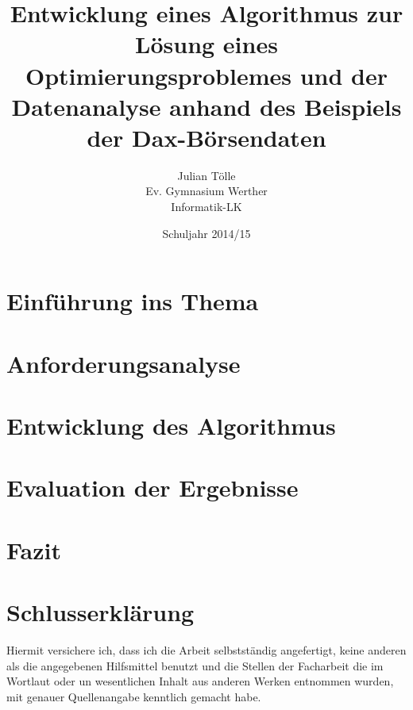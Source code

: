 \documentclass[11pt, a4paper, titlepage, draft]{report}
\begin{document}
    \title{Entwicklung eines Algorithmus zur Lösung eines Optimierungsproblemes und der Datenanalyse anhand des Beispiels der Dax-Börsendaten}
    \author{Julian Tölle\\
            Ev. Gymnasium Werther\\
            Informatik-LK}
    \date{Schuljahr 2014/15}

    \maketitle

    \tableofcontents    

    \chapter{Einführung ins Thema}

    \chapter{Anforderungsanalyse}

    \chapter{Entwicklung des Algorithmus}

    \chapter{Evaluation der Ergebnisse}

    \chapter{Fazit}

    \chapter{Schlusserklärung}
    Hiermit versichere ich, dass ich die Arbeit selbstständig angefertigt, keine anderen als die angegebenen Hilfsmittel benutzt und die Stellen der Facharbeit die im Wortlaut oder un wesentlichen Inhalt aus anderen Werken entnommen wurden, mit genauer Quellenangabe kenntlich gemacht habe.
\end{document}

